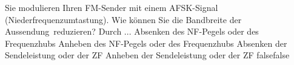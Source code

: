     {Sie modulieren Ihren FM-Sender mit einem AFSK-Signal (Niederfrequenzumtastung). Wie können Sie die Bandbreite der Aussendung reduzieren? Durch ...}
    {Absenken des NF-Pegels oder des Frequenzhubs}
    {Anheben des NF-Pegels oder des Frequenzhubs}
    {Absenken der Sendeleistung oder der ZF}
    {Anheben der Sendeleistung oder der ZF}
    {false}{false}